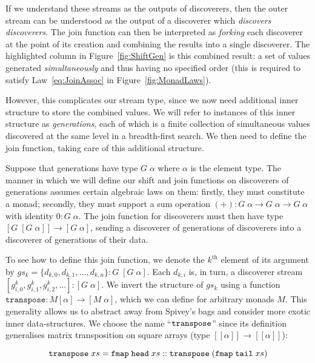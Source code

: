 If we understand these streams as the outputs of discoverers, then the outer stream can be understood as the output of a discoverer which \emph{discovers discoverers}. The join function can then be interpreted as \emph{forking} each discoverer at the point of its creation and combining the results into a single discoverer. The highlighted column in Figure~\ref{fig:ShiftGen} is this combined result: a set of values generated \emph{simultaneously} and thus having no specified order (this is required to satisfy Law~\ref{eq:JoinAssoc} in Figure~\ref{fig:MonadLaws}).

However, this complicates our stream type, since we now need additional inner structure to store the combined values. We will refer to instances of this inner structure as \emph{generations}, each of which is a finite collection of simultaneous values discovered at the same level in a breadth-first search. We then need to define the join function, taking care of this additional structure.

Suppose that generations have type $G\;\alpha$ where $\alpha$ is the element type. The manner in which we will define our shift and join functions on discoverers of generations assumes certain algebraic laws on them: firstly, they must constitute a monad; secondly, they must support a sum operation \mbox{$(+):G\;\alpha\rightarrow G\;\alpha\rightarrow G\;\alpha$} with identity $0:G\;\alpha$. The join function for discoverers must then have type $[G\;[G\;\alpha]] \rightarrow [G\;\alpha]$, sending a discoverer of generations of discoverers into a discoverer of generations of their data. 

To see how to define this join function, we denote the $k^{\text{th}}$ element of its argument by $gs_k = \{d_{k,0}, d_{k,1}, \ldots, d_{k,n}\} : G\;[G\;\alpha] $. Each $d_{k,i}$ is, in turn, a discoverer stream $[g^k_{i,0}, g^k_{i,1}, g^k_{i,2}, \ldots] : [G\;\alpha]$. We invert the structure of $gs_k$ using a function $\texttt{transpose}  : M[\alpha]\rightarrow [M\;\alpha]$, which we can define for arbitrary monads $M$. This generality allows us to abstract away from Spivey's bags and consider more exotic inner data-structures. We choose the name ``$\texttt{transpose}$'' since its definition generalises matrix transposition on square arrays (type $[[\alpha]]\rightarrow[[\alpha]]$):

\begin{displaymath}
\texttt{transpose}\;xs = \texttt{fmap}\;\texttt{head}\;xs :: \texttt{transpose}\; (\texttt{fmap}\;\texttt{tail}\;xs)
\end{displaymath}

